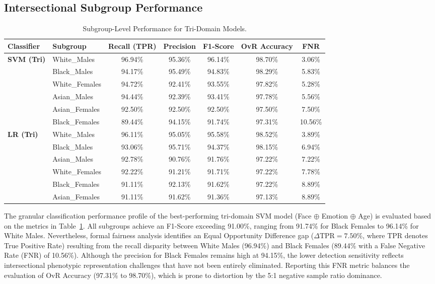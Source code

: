 \subsection{Intersectional Subgroup Performance}
\label{sec:subgroup_performance}
\label{sec:intersectional_subgroup_performance}

\begin{table}[htbp]
\caption{Subgroup-Level Performance for Tri-Domain Models.}
\label{tab:XI}
\centering
\begin{tabular}{llccccc}
\toprule
Classifier & Subgroup & Recall (TPR) & Precision & F1-Score & OvR Accuracy & FNR \\
\midrule
\multirow{6}{*}{\textbf{SVM (Tri)}} & White\_Males & 96.94\% & 95.36\% & 96.14\% & 98.70\% & 3.06\% \\
 & Black\_Males & 94.17\% & 95.49\% & 94.83\% & 98.29\% & 5.83\% \\
 & White\_Females & 94.72\% & 92.41\% & 93.55\% & 97.82\% & 5.28\% \\
 & Asian\_Males & 94.44\% & 92.39\% & 93.41\% & 97.78\% & 5.56\% \\
 & Asian\_Females & 92.50\% & 92.50\% & 92.50\% & 97.50\% & 7.50\% \\
 & Black\_Females & 89.44\% & 94.15\% & 91.74\% & 97.31\% & 10.56\% \\
\midrule
\multirow{6}{*}{\textbf{LR (Tri)}} & White\_Males & 96.11\% & 95.05\% & 95.58\% & 98.52\% & 3.89\% \\
 & Black\_Males & 93.06\% & 95.71\% & 94.37\% & 98.15\% & 6.94\% \\
 & Asian\_Males & 92.78\% & 90.76\% & 91.76\% & 97.22\% & 7.22\% \\
 & White\_Females & 92.22\% & 91.21\% & 91.71\% & 97.22\% & 7.78\% \\
 & Black\_Females & 91.11\% & 92.13\% & 91.62\% & 97.22\% & 8.89\% \\
 & Asian\_Females & 91.11\% & 91.62\% & 91.36\% & 97.13\% & 8.89\% \\
\bottomrule
\end{tabular}
\end{table}

The granular classification performance profile of the best-performing tri-domain SVM model (Face $\oplus$ Emotion $\oplus$ Age) is evaluated based on the metrics in Table~\ref{tab:XI}. All subgroups achieve an F1-Score exceeding 91.00\%, ranging from 91.74\% for Black Females to 96.14\% for White Males. Nevertheless, formal fairness analysis identifies an Equal Opportunity Difference gap ($\Delta\text{TPR} = 7.50\%$, where TPR denotes True Positive Rate) resulting from the recall disparity between White Males (96.94\%) and Black Females (89.44\% with a False Negative Rate (FNR) of 10.56\%). Although the precision for Black Females remains high at 94.15\%, the lower detection sensitivity reflects intersectional phenotypic representation challenges that have not been entirely eliminated. Reporting this FNR metric balances the evaluation of OvR Accuracy (97.31\% to 98.70\%), which is prone to distortion by the 5:1 negative sample ratio dominance.

